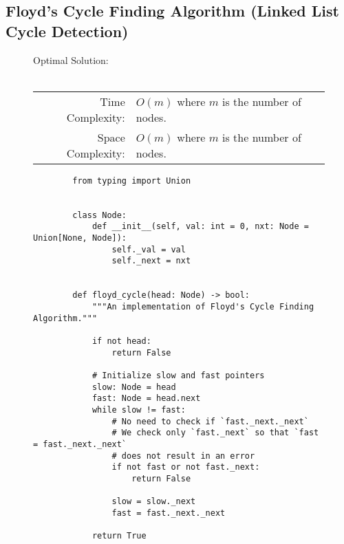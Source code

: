 
\subsection{Floyd's Cycle Finding Algorithm (Linked List Cycle Detection)}

\begin{figure}[H]
    Optimal Solution:\\\\
    \begin{tabular}{rl}
        Time Complexity:& \(O(m)\) where \(m\) is the number of nodes.\\
        Space Complexity:& \(O(m)\) where \(m\) is the number of nodes.
    \end{tabular}
\end{figure}

\begin{figure}[H]
    \centering
    \begin{verbatim}
        from typing import Union


        class Node:
            def __init__(self, val: int = 0, nxt: Node = Union[None, Node]):
                self._val = val
                self._next = nxt


        def floyd_cycle(head: Node) -> bool:
            """An implementation of Floyd's Cycle Finding Algorithm."""

            if not head:
                return False

            # Initialize slow and fast pointers
            slow: Node = head
            fast: Node = head.next
            while slow != fast:
                # No need to check if `fast._next._next`
                # We check only `fast._next` so that `fast = fast._next._next`
                # does not result in an error
                if not fast or not fast._next:
                    return False

                slow = slow._next
                fast = fast._next._next

            return True
    \end{verbatim}
\end{figure}
